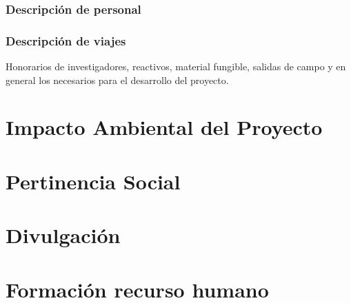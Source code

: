 \documentclass[12pt]{article}
\begin{document}
\subsubsection*{Descripci\'on de personal}

\subsubsection*{Descripci\'on de viajes}

Honorarios de investigadores, reactivos, material fungible, salidas de
campo y en general los necesarios para el desarrollo del proyecto. 

\section{Impacto Ambiental del Proyecto}
\section{Pertinencia Social}

\section{Divulgaci\'on}

\section{Formaci\'on recurso humano}
\end{document}
